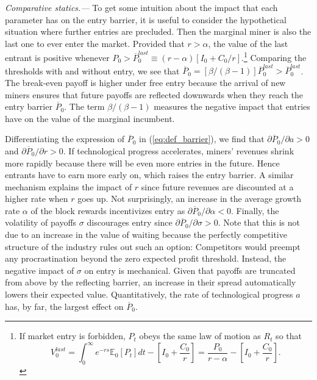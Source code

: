 \documentclass[12pt, a4paper]{article}
\makeatletter
\renewcommand{\subsection}{\@startsection{subsection}{2}{0mm}{-0.8\baselineskip}{.5\baselineskip}{\normalfont\normalsize\bfseries}}
\makeatother
\begin{document}
\emph{Comparative statics.---} To get some intuition about the impact that each parameter
has on the entry barrier, it is useful to consider the hypothetical
situation where further entries are precluded. Then the marginal
miner is also the last one to ever enter the market. Provided that $r>\alpha$, the value
of the last entrant is positive
whenever $P_0>\overline{P}^{last}_0 \equiv (r-\alpha )\left[I_{0}+ C_0/r\right]$.\footnote{If
market entry is forbidden, $P_t$ obeys the same law of motion as $R_t$ so that
$$V^{last}_0=\int_{0}^{\infty}e^{-rs}\mathbb{E}_0\left[P_t\right]dt-\left[I_{0}+ \frac{C_0}{r}\right]=\frac{P_0}{r-\alpha}-\left[I_{0}+ \frac{C_0}{r}\right].$$}
Comparing the thresholds with and without entry, we see that $\overline{P}_0=[\beta/(\beta -1)]\overline{P}^{last}_0>\overline{P}^{last}_0$.
The break-even payoff is higher under free entry because the arrival of new miners ensures that future payoffs are reflected downwards
when they reach the entry barrier $\overline{P}_0$. The term $\beta/(\beta -1)$ measures the negative impact that entries have on the value of the marginal incumbent.

Differentiating the expression of $\overline{P}_0$ in (\ref{eq:def_barrier}),
we find that $\partial \overline{P}_0/\partial a>0$ and $\partial \overline{P%
}_0/ \partial r>0$. If technological progress accelerates, miners' revenues
shrink more rapidly because there will be even more entries in the future. Hence
entrants have to earn more early on, which raises the entry
barrier. A similar mechanism explains the impact of $r$ since
future revenues are discounted at a higher rate when $r$ goes up.
Not surprisingly, an increase in the average growth rate $\alpha$ of the
block rewards incentivizes entry as $\partial \overline{P}_0/\partial \alpha<0
$. Finally, the volatility of payoffs $\sigma$ discourages entry since $%
\partial \overline{P}_0/\partial \sigma>0$. Note that this is not due
to an increase in the value of waiting because the perfectly competitive
structure of the industry rules out such an option: Competitors would
preempt any procrastination beyond the zero expected profit threshold.
Instead, the negative impact of $\sigma$ on entry is mechanical.
Given that payoffs are truncated from above by the reflecting barrier, an
increase in their spread automatically lowers their expected value.
Quantitatively, the rate of technological progress $a$ has, by far, the
largest effect on $\overline{P}_0$.

\subsection{Extensions}
\label{subsec:Halvings}
\end{document}
